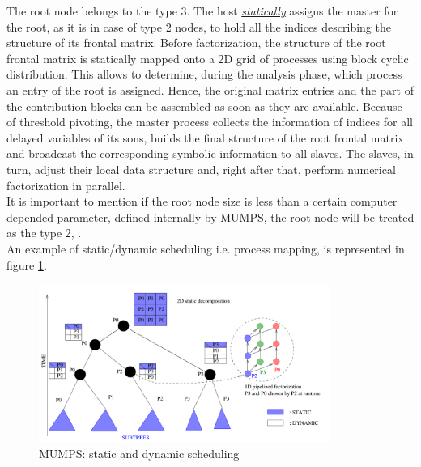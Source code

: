 The root node belongs to the type 3. The host \underline{\textit{statically}} assigns the master for the root, as it is in case of type 2 nodes, to hold all the indices describing the structure of its frontal matrix. Before factorization, the structure of the root frontal matrix is statically mapped onto a 2D grid of processes using block cyclic distribution. This allows to determine, during the analysis phase, which process an entry of the root is assigned. Hence, the original matrix entries and the part of the contribution blocks can be assembled as soon as they are available. Because of threshold pivoting, the master process collects the information of indices for all delayed variables of its sons, builds the final structure of the root frontal matrix and broadcast the corresponding symbolic information to all slaves. The slaves, in turn, adjust their local data structure and, right after that, perform numerical factorization in parallel.\\


It is important to mention if the root node size is less than a certain computer depended parameter, defined internally by MUMPS, the root node will be treated as the type 2, \cite{mumps-manual}.\\


An example of static/dynamic scheduling i.e. process mapping, is represented in figure \ref{fig:mumps:mapping-and-scheduling}.\\


\figpointer{\ref{fig:mumps:mapping-and-scheduling}}
\begin{figure}[htpb]
  \centering
  \includegraphics[width=0.85\textwidth]{figures/chapter-2/mumps-task-data-parallelism-2.png}
\caption{MUMPS: static and dynamic scheduling \cite{l2012multifrontal}}
\label{fig:mumps:mapping-and-scheduling}
\end{figure}


